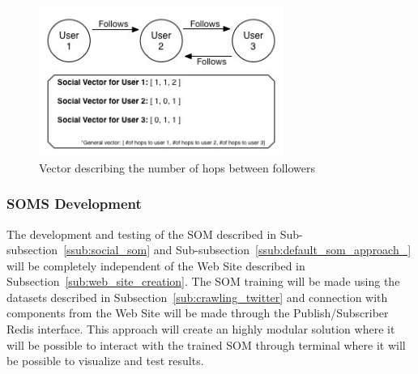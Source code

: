 \begin{figure}[tb]
  \begin{center}
    \includegraphics[width=8cm]{images/11_hops_svm.jpg}
  \end{center}
  \caption{Vector describing the number of hops between followers}
  \label{fig:hops}
\end{figure}
\subsubsection{SOMS Development} %
\label{ssub:soms_development}
The development and testing of the SOM described in Sub-subsection~\ref{ssub:social_som} and Sub-subsection~\ref{ssub:default_som_approach_} will be completely independent of the Web Site described in Subsection~\ref{sub:web_site_creation}. The SOM training will be made using the datasets described in Subsection~\ref{sub:crawling_twitter} and connection with components from the Web Site will be made through the Publish/Subscriber Redis interface. This approach will create an highly modular solution where it will be possible to interact with the trained SOM through terminal where it will be possible to visualize and test results.

